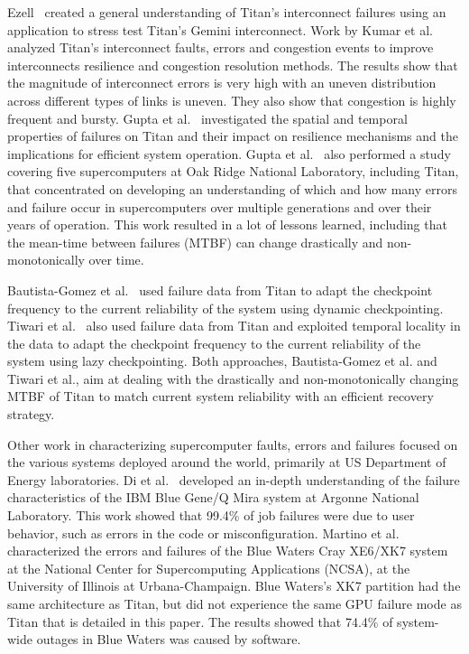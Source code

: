 Ezell~\cite{osti_1086655} created a general understanding of Titan's interconnect failures using an application to stress test Titan's Gemini interconnect.
%
Work by Kumar et al.~\cite{kumar18understanding} analyzed Titan's interconnect faults, errors and congestion events to improve interconnects resilience and congestion resolution methods. The results show that the magnitude of interconnect errors is very high with an uneven distribution across different types of links is uneven. They also show that congestion is highly frequent and bursty.
%
Gupta et al.~\cite{7266836} investigated the spatial and temporal properties of failures on Titan and their impact on resilience mechanisms and the implications for efficient system operation.
%
Gupta et al.~\cite{gupta17failures} also performed a study covering five supercomputers at Oak Ridge National Laboratory, including Titan, that concentrated on developing an understanding of which and how many errors and failure occur in supercomputers over multiple generations and over their years of operation. This work resulted in a lot of lessons learned, including that the mean-time between failures (MTBF) can change drastically and non-monotonically over time.

Bautista-Gomez et al.~\cite{bautista-gomez16reducing} used failure data from Titan to adapt the checkpoint frequency to the current reliability of the system using dynamic checkpointing.
%
Tiwari et al.~\cite{6903564} also used failure data from Titan and exploited temporal locality in the data to adapt the checkpoint frequency to the current reliability of the system using lazy checkpointing.
%
Both approaches, Bautista-Gomez et al. and Tiwari et al., aim at dealing with the drastically and non-monotonically changing MTBF of Titan to match current system reliability with an efficient recovery strategy.

Other work in characterizing supercomputer faults, errors and failures focused on the various systems deployed around the world, primarily at US Department of Energy laboratories.
%
Di et al.~\cite{8809553} developed an in-depth understanding of the failure characteristics of the IBM Blue Gene/Q Mira system at Argonne National Laboratory. This work showed that 99.4\% of job failures were due to user behavior, such as errors in the code or misconfiguration. Martino et al.~\cite{6903615} characterized the errors and failures of the Blue Waters Cray XE6/XK7 system at the National Center for Supercomputing Applications (NCSA), at the University of Illinois at Urbana-Champaign. Blue Waters's XK7 partition had the same architecture as Titan, but did not experience the same GPU failure mode as Titan that is detailed in this paper. The results showed that 74.4\% of system-wide outages in Blue Waters was caused by software.
